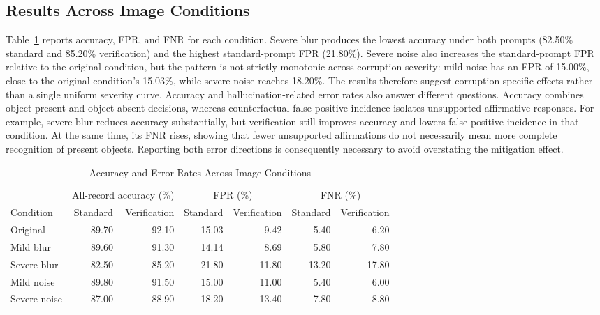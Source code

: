 \documentclass[conference]{IEEEtran}
\begin{document}
\subsection{Results Across Image Conditions}
Table~\ref{tab:condition} reports accuracy, FPR, and FNR for each condition. Severe blur produces the lowest accuracy under both prompts (82.50\% standard and 85.20\% verification) and the highest standard-prompt FPR (21.80\%). Severe noise also increases the standard-prompt FPR relative to the original condition, but the pattern is not strictly monotonic across corruption severity: mild noise has an FPR of 15.00\%, close to the original condition's 15.03\%, while severe noise reaches 18.20\%. The results therefore suggest corruption-specific effects rather than a single uniform severity curve. Accuracy and hallucination-related error rates also answer different questions. Accuracy combines object-present and object-absent decisions, whereas counterfactual false-positive incidence isolates unsupported affirmative responses. For example, severe blur reduces accuracy substantially, but verification still improves accuracy and lowers false-positive incidence in that condition. At the same time, its FNR rises, showing that fewer unsupported affirmations do not necessarily mean more complete recognition of present objects. Reporting both error directions is consequently necessary to avoid overstating the mitigation effect.

\begin{table}[t]
\caption{Accuracy and Error Rates Across Image Conditions}
\label{tab:condition}
\centering
\footnotesize
\begin{tabular}{lrrrrrr}
\toprule
& \multicolumn{2}{c}{All-record accuracy (\%)} & \multicolumn{2}{c}{FPR (\%)} & \multicolumn{2}{c}{FNR (\%)} \\
\cmidrule(lr){2-3}\cmidrule(lr){4-5}\cmidrule(lr){6-7}
Condition & Standard & Verification & Standard & Verification & Standard & Verification \\
\midrule
Original & 89.70 & 92.10 & 15.03 & 9.42 & 5.40 & 6.20 \\
Mild blur & 89.60 & 91.30 & 14.14 & 8.69 & 5.80 & 7.80 \\
Severe blur & 82.50 & 85.20 & 21.80 & 11.80 & 13.20 & 17.80 \\
Mild noise & 89.80 & 91.50 & 15.00 & 11.00 & 5.40 & 6.00 \\
Severe noise & 87.00 & 88.90 & 18.20 & 13.40 & 7.80 & 8.80 \\
\bottomrule
\end{tabular}
\end{table}
\end{document}
